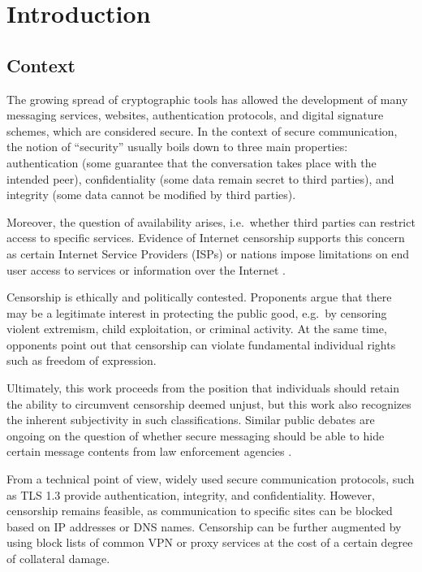 \chapter{Introduction}\label{ch:introduction}

\section{Context} \label{sec:context}

The growing spread of cryptographic tools has allowed the development of many messaging services, websites, authentication protocols, and digital signature schemes, which are considered secure.
In the context of secure communication, the notion of ``security'' usually boils down to three main properties: authentication (some guarantee that the conversation takes place with the intended peer), confidentiality (some data remain secret to third parties), and integrity (some data cannot be modified by third parties).

Moreover, the question of availability arises, i.e.~whether third parties can restrict access to specific services. Evidence of Internet censorship supports this concern as certain Internet Service Providers (ISPs) or nations impose limitations on end user access to services or information over the Internet \cite{CCS:RSKE20,SP:NCWHRC20,master2023worldwide}.

Censorship is ethically and politically contested. Proponents argue that there may be a legitimate interest in protecting the public good, e.g.~by censoring violent extremism, child exploitation, or criminal activity. At the same time, opponents point out that censorship can violate fundamental individual rights such as freedom of expression.

Ultimately, this work proceeds from the position that individuals should retain the ability to circumvent censorship deemed unjust, but this work also recognizes the inherent subjectivity in such classifications. Similar public debates are ongoing on the question of whether secure messaging should be able to hide certain message contents from law enforcement agencies \cite{menn2019facebook,townsend2025encryption}.

From a technical point of view, widely used secure communication protocols, such as TLS 1.3 provide authentication, integrity, and confidentiality. However, censorship remains feasible, as communication to specific sites can be blocked based on IP addresses or DNS names. Censorship can be further augmented by using block lists of common VPN or proxy services at the cost of a certain degree of collateral damage.

